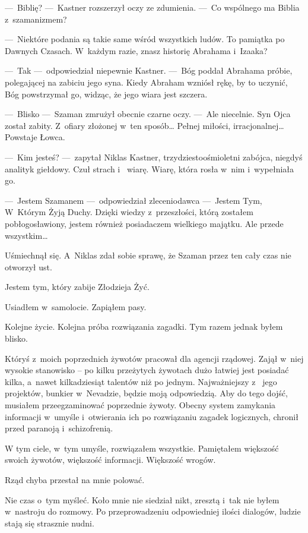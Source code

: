 ---~Biblię? ---~Kastner rozszerzył oczy ze zdumienia. ---~Co wspólnego ma Biblia z~szamanizmem?

---~Niektóre podania są takie same wśród wszystkich ludów. To pamiątka po Dawnych Czasach. W~każdym razie, znasz 
historię Abrahama i~Izaaka?

---~Tak ---~odpowiedział niepewnie Kastner. ---~Bóg poddał Abrahama próbie, polegającej na zabiciu jego syna. Kiedy 
Abraham wzniósł rękę, by to uczynić, Bóg powstrzymał go, widząc, że jego wiara jest szczera.

---~Blisko ---~Szaman zmrużył obecnie czarne oczy. ---~Ale niecelnie. Syn Ojca został zabity. Z~ofiary złożonej w~ten 
sposób… Pełnej miłości, irracjonalnej… Powstaje Łowca.

---~Kim jesteś? ---~zapytał Niklas Kastner, trzydziestoośmioletni zabójca, niegdyś analityk giełdowy. Czuł strach i~
wiarę. Wiarę, która rosła w~nim i~wypełniała go.

---~Jestem Szamanem ---~odpowiedział zleceniodawca ---~Jestem Tym, W~Którym Żyją Duchy. Dzięki wiedzy z~przeszłości, 
którą zostałem pobłogosławiony, jestem również posiadaczem wielkiego majątku. Ale przede wszystkim…

Uśmiechnął się. A~Niklas zdał sobie sprawę, że Szaman przez ten cały czas nie otworzył ust.

Jestem tym, który zabije Złodzieja Żyć.

\paraSep

Usiadłem w~samolocie. Zapiąłem pasy.

Kolejne życie. Kolejna próba rozwiązania zagadki. Tym razem jednak byłem blisko.

Któryś z~moich poprzednich żywotów pracował dla agencji rządowej. Zajął w~niej wysokie stanowisko -- po kilku 
przeżytych żywotach dużo łatwiej jest posiadać kilka, a~nawet kilkadziesiąt talentów niż po jednym. Najważniejszy z~
jego projektów, bunkier w~Nevadzie, będzie moją odpowiedzią. Aby do tego dojść, musiałem przeegzaminować poprzednie 
żywoty. Obecny system zamykania informacji w~umyśle i~otwierania ich po rozwiązaniu zagadek logicznych, chronił przed 
paranoją i~schizofrenią. 

W tym ciele, w~tym umyśle, rozwiązałem wszystkie. Pamiętałem większość swoich żywotów, większość informacji. 
Większość wrogów.

Rząd chyba przestał na mnie polować.

Nie czas o~tym myśleć. Koło mnie nie siedział nikt, zresztą i~tak nie byłem w~nastroju do rozmowy. Po przeprowadzeniu 
odpowiedniej ilości dialogów, ludzie stają się strasznie nudni.

